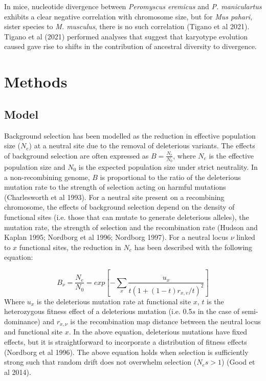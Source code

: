 \documentclass[10pt,twoside, twocolumn]{GSA_format}
\begin{document}
In mice, nucleotide divergence between \textit{Peromyscus eremicus} and \textit{P. maniculartus} exhibits a clear negative correlation with chromosome size, but for \textit{Mus pahari}, sister species to \textit{M. musculus}, there is no such correlation (Tigano et al 2021). Tigano et al (2021) performed analyses that suggest that karyotype evolution caused gave rise to shifts in the contribution of ancestral diversity to divergence. 

\section{Methods}
\subsection{Model}
Background selection has been modelled as the reduction in effective population size ($N_e$) at a neutral site due to the removal of deleterious variants. The effects of background selection are often expressed as $B = \frac{N_e}{N_0}$, where $N_e$ is the effective population size and $N_0$ is the expected population size under strict neutrality. In a non-recombining genome, $B$ is proportional to the ratio of the deleterious mutation rate to the strength of selection acting on harmful mutations (Charlesworth et al 1993). For a neutral site present on a recombining chromosome, the effects of background selection depend on the density of functional sites (i.e. those that can mutate to generate deleterious alleles), the mutation rate, the strength of selection and the recombination rate (Hudson and Kaplan 1995; Nordborg et al 1996; Nordborg 1997). For a neutral locus $\nu$ linked to $x$ functional sites, the reduction in $N_e$ has been described with the following equation:

\begin{equation}
B_{\nu} = \frac{N_e}{N_0} = exp[ -\sum\limits_x \frac{u_x}{t(1+(1-t)r_{x,v}/t)^2} ]
\label{nordborg}
\end{equation}\noindent
Where $u_x$ is the deleterious mutation rate at functional site $x$, $t$ is the heterozygous fitness effect of a deleterious mutation (i.e. 0.5$s$ in the case of semi-dominance) and $r_{x,\nu}$ is the recombination map distance between the neutral locus and functional site $x$. In the above equation, deleterious mutations have fixed effects, but it is straightforward to incorporate a distribution of fitness effects (Nordborg et al 1996). The above equation holds when selection is sufficiently strong  such that random drift does not overwhelm selection ($N_es > 1$) (Good et al 2014). \\
\end{document}

